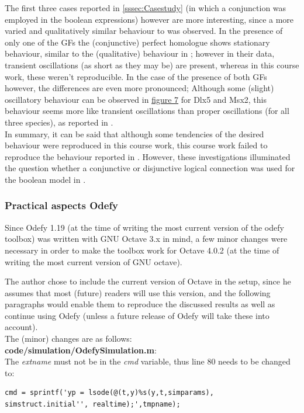 \documentclass[11pt]{article}
\begin{document}
The first three cases reported in \ref{sssec:Casestudy} (in which a conjunction was employed in the boolean expressions) however are more interesting, since a more varied and qualitatively similar behaviour to \cite{Kirkham} was observed.
In the presence of only one of the GFs the (conjunctive) perfect homologue shows stationary behaviour, similar to the (qualitative) behaviour in \cite{Kirkham}; however in their data, transient oscillations (as short as they may be) are present, whereas in this course work, these weren't reproducible. 
In the case of the presence of both GFs however, the differences are even more pronounced; Although some (slight) oscillatory behaviour can be observed in \hyperref[thirdCase]{figure 7} for Dlx5 and Msx2, this behaviour seems more like transient oscillations than proper oscillations (for all three species), as reported in \cite{Kirkham}. \\

In summary, it can be said that although some tendencies of the desired behaviour were reproduced in this course work, this course work failed to reproduce the behaviour reported in \cite{Kirkham}.
However, these investigations illuminated the question whether a conjunctive or disjunctive logical connection was used for the boolean model in \cite{Kirkham}.


\subsubsection{Practical aspects Odefy} \label{sssec:ChangesOdefy}
Since Odefy 1.19 (at the time of writing the most current version of the odefy toolbox) was written with GNU Octave 3.x in mind, a few minor changes were necessary in order to make the toolbox work for Octave 4.0.2 (at the time of writing the most current version of GNU octave). 

The author chose to include the current version of Octave in the setup, since he assumes that most (future) readers will use this version, and the following paragraphs would enable them to reproduce the discussed results as well as continue using Odefy (unless a future release of Odefy will take these into account). \\

The (minor) changes are as follows:
\\
\textbf{code/simulation/OdefySimulation.m}: \\
The \textit{extname} must not be in the \textit{cmd} variable, thus line 80 needs to be changed to:
\begin{lstlisting}
cmd = sprintf('yp = lsode(@(t,y)%s(y,t,simparams), 
simstruct.initial'', realtime);',tmpname);
\end{lstlisting}
\end{document}
